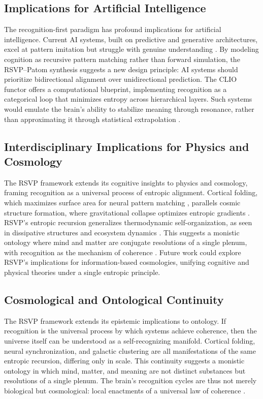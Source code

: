\documentclass[11pt]{article}
\begin{document}
\subsection{Implications for Artificial Intelligence}
The recognition-first paradigm has profound implications for artificial intelligence. Current AI systems, built on predictive and generative architectures, excel at pattern imitation but struggle with genuine understanding \citep{ball2019superglue, sullivan2019facebook}. By modeling cognition as recursive pattern matching rather than forward simulation, the RSVP--Patom synthesis suggests a new design principle: AI systems should prioritize bidirectional alignment over unidirectional prediction. The CLIO functor offers a computational blueprint, implementing recognition as a categorical loop that minimizes entropy across hierarchical layers. Such systems would emulate the brain’s ability to stabilize meaning through resonance, rather than approximating it through statistical extrapolation \citep{cheng2025clio, pinker2005computational}.

\subsection{Interdisciplinary Implications for Physics and Cosmology}
\label{subsec:physics-cosmology}
The RSVP framework extends its cognitive insights to physics and cosmology, framing recognition as a universal process of entropic alignment. Cortical folding, which maximizes surface area for neural pattern matching \citep{seung2012connectome}, parallels cosmic structure formation, where gravitational collapse optimizes entropic gradients \citep{jacobson1995thermodynamics, verlinde2011entropic}. RSVP’s entropic recursion generalizes thermodynamic self-organization, as seen in dissipative structures and ecosystem dynamics \citep{prigogine1984orderchaos, ulanowicz1986growth}. This suggests a monistic ontology where mind and matter are conjugate resolutions of a single plenum, with recognition as the mechanism of coherence \citep{leibniz1714monadology}. Future work could explore RSVP’s implications for information-based cosmologies, unifying cognitive and physical theories under a single entropic principle.


\subsection{Cosmological and Ontological Continuity}
The RSVP framework extends its epistemic implications to ontology. If recognition is the universal process by which systems achieve coherence, then the universe itself can be understood as a self-recognizing manifold. Cortical folding, neural synchronization, and galactic clustering are all manifestations of the same entropic recursion, differing only in scale. This continuity suggests a monistic ontology in which mind, matter, and meaning are not distinct substances but resolutions of a single plenum. The brain’s recognition cycles are thus not merely biological but cosmological: local enactments of a universal law of coherence \citep{leibniz1714monadology, engbersen2013brains}.
\end{document}
